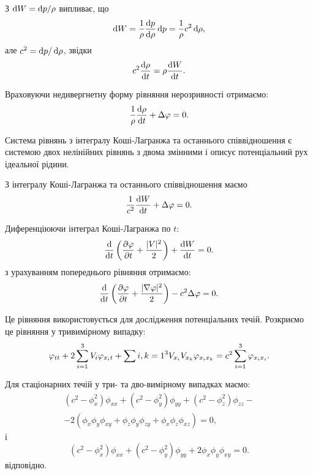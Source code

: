 З $\mathop{}\!\mathrm{d} W = \mathop{}\!\mathrm{d} p / \rho$ випливає, що
\begin{equation}
	\mathop{}\!\mathrm{d} W = \frac{1}{\rho} \frac{\mathop{}\!\mathrm{d} p}{\mathop{}\!\mathrm{d} \rho} \mathop{}\!\mathrm{d} p = \frac{1}{\rho} c^2 \mathop{}\!\mathrm{d} \rho,
\end{equation}
але $c^2 = \mathop{}\!\mathrm{d} p / \mathop{}\!\mathrm{d} \rho$, звідки
\begin{equation}
	c^2  \frac{\mathop{}\!\mathrm{d} \rho}{\mathop{}\!\mathrm{d} t} = \rho  \frac{\mathop{}\!\mathrm{d} W}{\mathop{}\!\mathrm{d} t}.
\end{equation}

Враховуючи недивергнетну форму рівняння нерозривності отримаємо:
\begin{equation}
	\frac{1}{\rho} \frac{\mathop{}\!\mathrm{d} \rho}{\mathop{}\!\mathrm{d} t} + \Delta \varphi = 0.
\end{equation}

Система рівнянь з інтегралу Коші-Лагранжа та останнього співвідношення є системою двох нелінійних рівнянь з двома змінними і описує потенціальний рух ідеальної рідини. \medskip

З інтегралу Коші-Лагранжа та останнього співвідношення маємо
\begin{equation}
	\frac{1}{c^2} \frac{\mathop{}\!\mathrm{d} W}{\mathop{}\!\mathrm{d} t} + \Delta \varphi = 0.
\end{equation}

Диференціюючи інтеграл Коші-Лагранжа по $t$:
\begin{equation}
	\frac{\mathop{}\!\mathrm{d}}{\mathop{}\!\mathrm{d} t} \left( \frac{\partial \varphi}{\partial t} + \frac{|V|^2}{2} \right) + \frac{\mathop{}\!\mathrm{d} W}{\mathop{}\!\mathrm{d} t} = 0.
\end{equation}
з урахуванням попереднього рівняння отримаємо:
\begin{equation}
	\frac{\mathop{}\!\mathrm{d}}{\mathop{}\!\mathrm{d} t} \left( \frac{\partial \varphi}{\partial t} + \frac{|\nabla \varphi|^2}{2} \right) - c^2 \Delta \varphi = 0.
\end{equation}

Це рівняння використовується для дослідження потенціальних течій. Розкриємо це рівняння у тривимірному випадку:
\begin{equation}
	\varphi_{tt} + 2 \displaystyle\sum\limits_{i = 1}^3 V_i \varphi_{x_i t} + \displaystyle\sum\limits{i,k = 1}^3 V_{x_i} V_{x_k} \varphi_{x_i x_k} = c^2 \displaystyle\sum\limits_{i = 1}^3 \varphi_{x_i x_i}.
\end{equation}

Для стаціонарних течій у три- та дво-вимірному випадках маємо:
\begin{multline}
	(c^2 -\phi_x^2)\phi_{xx}+(c^2-\phi_y^2)\phi_{yy}+(c^2-\phi_z^2)\phi_{zz}-\\
	-2(\phi_x\phi_y\phi_{xy}+\phi_z\phi_y\phi_{zy}+\phi_x\phi_z\phi_{xz})=0,
\end{multline}
і
\begin{equation}
	(c^2-\phi_x^2)\phi_{xx}+(c^2-\phi_y^2)\phi_{yy}+2\phi_x\phi_y\phi_{xy}=0.
\end{equation}
відповідно. \medskip

